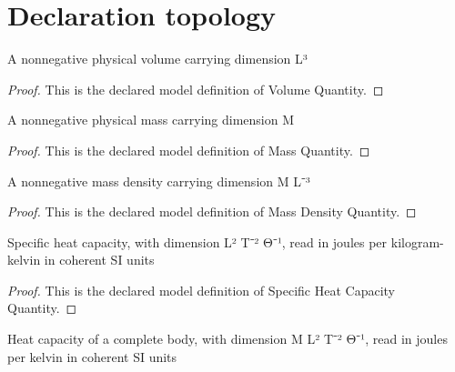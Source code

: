 \section{Declaration topology}
\begin{definition}
  \label{def:physics:phyx-mini-0455:phyxminiproblems-problemphyxmini0455-volumequantity}
  A nonnegative physical volume carrying dimension L³
\end{definition}
\begin{proof}
  This is the declared model definition of Volume Quantity.
\end{proof}
\begin{definition}
  \label{def:physics:phyx-mini-0455:phyxminiproblems-problemphyxmini0455-massquantity}
  A nonnegative physical mass carrying dimension M
\end{definition}
\begin{proof}
  This is the declared model definition of Mass Quantity.
\end{proof}
\begin{definition}
  \label{def:physics:phyx-mini-0455:phyxminiproblems-problemphyxmini0455-massdensityquantity}
  A nonnegative mass density carrying dimension M L⁻³
\end{definition}
\begin{proof}
  This is the declared model definition of Mass Density Quantity.
\end{proof}
\begin{definition}
  \label{def:physics:phyx-mini-0455:phyxminiproblems-problemphyxmini0455-specificheatcapacityquantity}
  Specific heat capacity, with dimension L² T⁻² Θ⁻¹, read in joules per kilogram-kelvin in coherent SI units
\end{definition}
\begin{proof}
  This is the declared model definition of Specific Heat Capacity Quantity.
\end{proof}
\begin{definition}
  \label{def:physics:phyx-mini-0455:phyxminiproblems-problemphyxmini0455-heatcapacityquantity}
  Heat capacity of a complete body, with dimension M L² T⁻² Θ⁻¹, read in joules per kelvin in coherent SI units
\end{definition}
